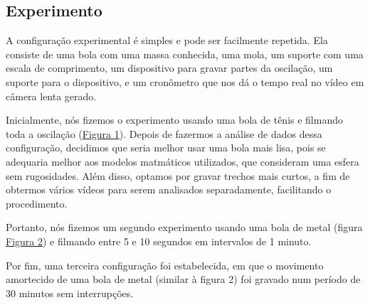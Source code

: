 \documentclass[a4paper, 12pt]{article}
\begin{document}
\begin{multicols}{2}
		\section{Experimento} \label{sec:experimento}
			\par A configuração experimental é simples e pode ser facilmente repetida. Ela consiste de uma bola com uma massa conhecida, uma mola, um suporte com uma escala de comprimento, um dispositivo para gravar partes da oscilação, um suporte para o dispositivo, e um cronômetro que nos dá o tempo real no vídeo em câmera lenta gerado.
			\par Inicialmente, nós fizemos o experimento usando uma bola de tênis e filmando toda a oscilação (\hyperref[img:tenis]{Figura 1}). Depois de fazermos a análise de dados dessa configuração, decidimos que seria melhor usar uma bola mais lisa, pois se adequaria melhor aos modelos matmáticos utilizados, que consideram uma esfera sem rugosidades. Além disso, optamos por gravar trechos mais curtos, a fim de obtermos vários vídeos para serem analisados separadamente, facilitando o procedimento.
			\par Portanto, nós fizemos um segundo experimento usando uma bola de metal (figura \hyperref[img:metal]{Figura 2}) e filmando entre 5 e 10 segundos em intervalos de 1 minuto.
			\par Por fim, uma terceira configuração foi estabelecida, em que o movimento amortecido de uma bola de metal (similar à figura 2) foi gravado num período de 30 minutos sem interrupções.
			\begin{figure}[H] \label{img:tenis}
				\centering

\end{figure}
\end{multicols}
\end{document}
